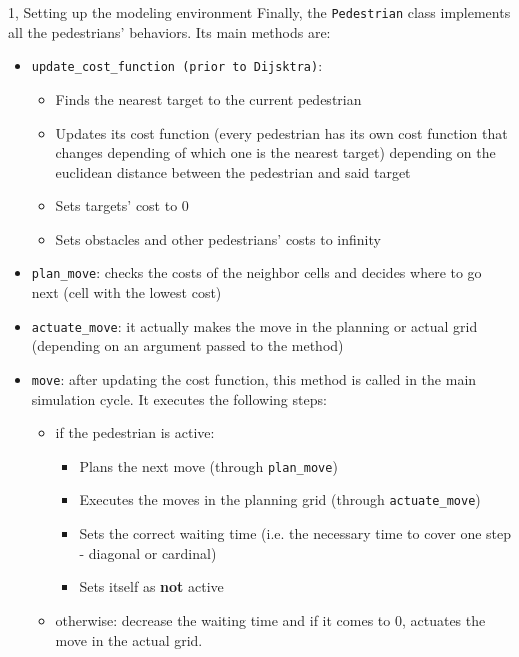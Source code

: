 \documentclass[10pt,a4paper]{article}
\begin{document}
\begin{task}{1, Setting up the modeling environment}
Finally, the \texttt{Pedestrian} class implements all the pedestrians' behaviors.
Its main methods are:
\begin{itemize}
    \item \texttt{update\_cost\_function (prior to Dijsktra)}:
    \begin{itemize}
        \item Finds the nearest target to the current pedestrian
        \item Updates its cost function (every pedestrian has its own cost function that changes depending of which one is the nearest target) depending on the euclidean distance between the pedestrian and said target
        \item Sets targets' cost to 0
        \item Sets obstacles and other pedestrians' costs to infinity
    \end{itemize}
    \item \texttt{plan\_move}: checks the costs of the neighbor cells and decides where to go next (cell with the lowest cost)
    \item \texttt{actuate\_move}: it actually makes the move in the planning or actual grid (depending on an argument passed to the method)
    \item \texttt{move}: after updating the cost function, this method is called in the main simulation cycle. It executes the following steps:
    \begin{itemize}
        \item if the pedestrian is active:
        \begin{itemize}
            \item Plans the next move (through \texttt{plan\_move})
            \item Executes the moves in the planning grid (through \texttt{actuate\_move})
            \item Sets the correct waiting time (i.e. the necessary time to cover one step - diagonal or cardinal)
            \item Sets itself as \textbf{not} active
        \end{itemize}
        \item otherwise: decrease the waiting time and if it comes to 0, actuates the move in the actual grid.
    \end{itemize}
\end{itemize}
\end{task}
\end{document}
